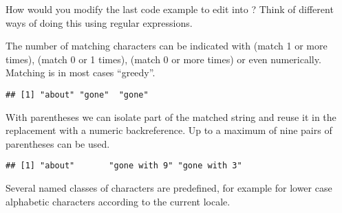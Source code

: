 \documentclass[krantz2]{krantz}\usepackage{knitr}
\begin{document}
\begin{playground}
  How would you modify the last code example to edit  into ? Think of different ways of doing this using regular expressions.
\end{playground}

The number of matching characters can be indicated with \code{+} (match 1 or more times),  (match 0 or 1 times), \code{*} (match 0 or more times) or even numerically. Matching is in most cases ``greedy''.

\begin{knitrout}\footnotesize
{}\color{fgcolor}\begin{kframe}
\begin{alltt}
\hlstd{(} \hlstd{=} \hlstd{,}
      \hlstd{=} \hlstd{,}
      \hlstd{=} \hlstd{(}\hlstd{,} \hlstd{,} \hlstd{))}
\end{alltt}
\begin{verbatim}
## [1] "about" "gone"  "gone"
\end{verbatim}
\end{kframe}
\end{knitrout}

With parentheses we can isolate part of the matched string and reuse it in the replacement with a numeric backreference. Up to a maximum of nine pairs of parentheses can be used.

\begin{knitrout}\footnotesize
{}\color{fgcolor}\begin{kframe}
\begin{alltt}
\hlstd{(} \hlstd{=} \hlstd{,}
      \hlstd{=} \hlstd{,}
      \hlstd{=} \hlstd{(}\hlstd{,} \hlstd{,} \hlstd{))}
\end{alltt}
\begin{verbatim}
## [1] "about"       "gone with 9" "gone with 3"
\end{verbatim}
\end{kframe}
\end{knitrout}

Several named classes of characters are predefined, for example  for lower case alphabetic characters according to the current locale.
\end{document}
